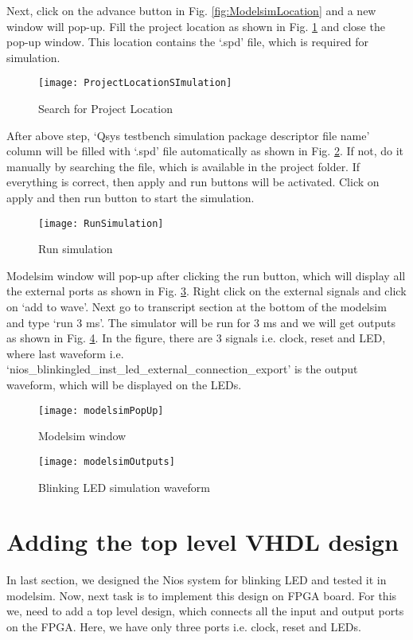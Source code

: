  Next, click on the advance button in Fig. \ref{fig:ModelsimLocation} and a new window will pop-up. Fill the project location as shown in Fig. \ref{fig:ProjectLocationSImulation} and close the pop-up window. This location contains the `.spd' file, which is required for simulation. 
 \begin{figure}[!h]
 	\centering
 	\texttt{[image: ProjectLocationSImulation]}
 	\caption{Search for Project Location}
 	\label{fig:ProjectLocationSImulation}
 \end{figure}
 
After above step, `Qsys testbench simulation package descriptor file name' column will be filled with `.spd' file automatically as shown in Fig. \ref{fig:RunSimulation}. If not, do it manually by searching the file, which is available in the project folder. If everything is correct, then apply and run buttons will be activated. Click on apply and then run button to start the simulation. 
  \begin{figure}[!h]
  	\centering
  	\texttt{[image: RunSimulation]}
  	\caption{Run simulation}
  	\label{fig:RunSimulation}
  \end{figure}
 
Modelsim window will pop-up after clicking the run button, which will display all the external ports as shown in Fig. \ref{fig:modelsimPopUp}. Right click on the external signals and click on `add to wave'. Next go to transcript section at the bottom of the modelsim and type `run 3 ms'. The simulator will be run for 3 ms and we will get outputs as shown in Fig. \ref{fig:modelsimOutputs}. In the figure, there are 3 signals i.e. clock, reset and LED, where last waveform i.e. `nios\_blinkingled\_inst\_led\_external\_connection\_export' is the output waveform, which will be displayed on the LEDs. 

 \begin{figure}[!h]
 	\centering
 	\texttt{[image: modelsimPopUp]}
 	\caption{Modelsim window}
 	\label{fig:modelsimPopUp}
 \end{figure}
 
  \begin{figure}[!h]
  	\centering
  	\texttt{[image: modelsimOutputs]}
  	\caption{Blinking LED simulation waveform}
  	\label{fig:modelsimOutputs}
  \end{figure}

\section{Adding the top level VHDL design}
In last section, we designed the Nios system for blinking LED and tested it in modelsim. Now, next task is to implement this design on FPGA board. For this we, need to add a top level design, which connects all the input and output ports on the FPGA. Here, we have only three ports i.e. clock, reset and LEDs. 

